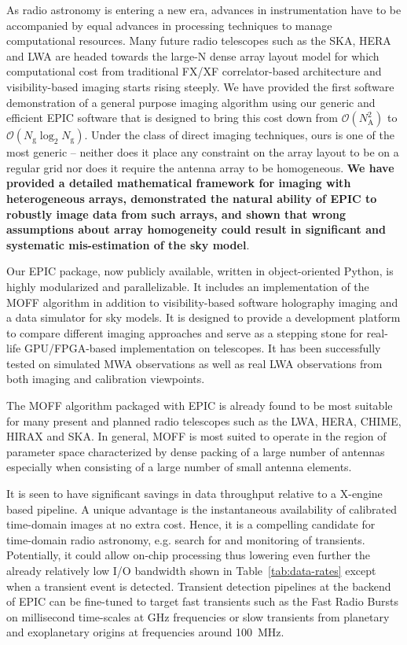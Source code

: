 \documentclass[a4paper,fleqn,usenatbib]{mnras}
\newcommand{\Nant}{N_\textrm{A}}
\newcommand{\Ngrid}{N_\textrm{g}}
\begin{document}
As radio astronomy is entering a new era, advances in instrumentation have to be accompanied by equal advances in processing techniques to manage computational resources. Many future radio telescopes such as the SKA, HERA and LWA are headed towards the large-N dense array layout model for which computational cost from traditional FX/XF correlator-based architecture and visibility-based imaging starts rising steeply. We have provided the first software demonstration of a general purpose imaging algorithm using our generic and efficient EPIC software that is designed to bring this cost down from $\mathcal{O}(\Nant^2)$ to $\mathcal{O}(\Ngrid\log_2 \Ngrid)$. Under the class of direct imaging techniques, ours is one of the most generic -- neither does it place any constraint on the array layout to be on a regular grid nor does it require the antenna array to be homogeneous. {\bf We have provided a detailed mathematical framework for imaging with heterogeneous arrays, demonstrated the natural ability of EPIC to robustly image data from such arrays, and shown that wrong assumptions about array homogeneity could result in significant and systematic mis-estimation of the sky model}.

Our EPIC package, now publicly available, written in object-oriented Python, is highly modularized and parallelizable. It includes an implementation of the MOFF algorithm in addition to visibility-based software holography imaging and a data simulator for sky models. It is designed to provide a development platform to compare different imaging approaches and serve as a stepping stone for real-life GPU/FPGA-based implementation on telescopes. It has been successfully tested on simulated MWA observations as well as real LWA observations from both imaging and calibration viewpoints. 

The MOFF algorithm packaged with EPIC is already found to be most suitable for many present and planned radio telescopes such as the LWA, HERA, CHIME, HIRAX and SKA. In general, MOFF is most suited to operate in the region of parameter space characterized by dense packing of a large number of antennas especially when consisting of a large number of small antenna elements. 

It is seen to have significant savings in data throughput relative to a X-engine based pipeline. A unique advantage is the instantaneous availability of calibrated time-domain images at no extra cost. Hence, it is a compelling candidate for time-domain radio astronomy, e.g. search for and monitoring of transients. Potentially, it could allow on-chip processing thus lowering even further the already relatively low I/O bandwidth shown in Table~\ref{tab:data-rates} except when a transient event is detected. Transient detection pipelines at the backend of EPIC can be fine-tuned to target fast transients such as the Fast Radio Bursts \citep[FRB;][]{tho13} on millisecond time-scales at GHz frequencies or slow transients from planetary and exoplanetary origins at frequencies around 100~MHz. 
\end{document}
